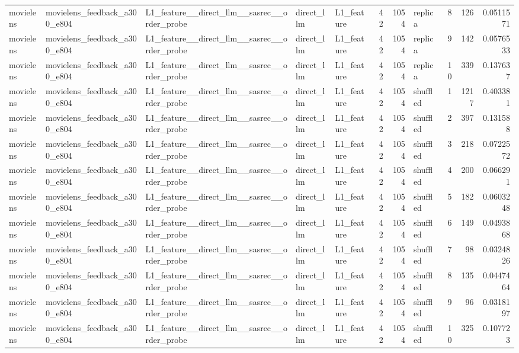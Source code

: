 \begin{table}[htbp!]
\begin{tabular}{lllllrrlrrr}
movielens & movielens\_feedback\_a300\_e804 & L1\_feature\_\_direct\_llm\_\_sasrec\_\_order\_probe & direct\_llm & L1\_feature & 42 & 1054 & replica & 8 & 126 & 0.0511571 \\
movielens & movielens\_feedback\_a300\_e804 & L1\_feature\_\_direct\_llm\_\_sasrec\_\_order\_probe & direct\_llm & L1\_feature & 42 & 1054 & replica & 9 & 142 & 0.0576533 \\
movielens & movielens\_feedback\_a300\_e804 & L1\_feature\_\_direct\_llm\_\_sasrec\_\_order\_probe & direct\_llm & L1\_feature & 42 & 1054 & replica & 10 & 339 & 0.137637 \\
movielens & movielens\_feedback\_a300\_e804 & L1\_feature\_\_direct\_llm\_\_sasrec\_\_order\_probe & direct\_llm & L1\_feature & 42 & 1054 & shuffled & 1 & 1217 & 0.403381 \\
movielens & movielens\_feedback\_a300\_e804 & L1\_feature\_\_direct\_llm\_\_sasrec\_\_order\_probe & direct\_llm & L1\_feature & 42 & 1054 & shuffled & 2 & 397 & 0.131588 \\
movielens & movielens\_feedback\_a300\_e804 & L1\_feature\_\_direct\_llm\_\_sasrec\_\_order\_probe & direct\_llm & L1\_feature & 42 & 1054 & shuffled & 3 & 218 & 0.0722572 \\
movielens & movielens\_feedback\_a300\_e804 & L1\_feature\_\_direct\_llm\_\_sasrec\_\_order\_probe & direct\_llm & L1\_feature & 42 & 1054 & shuffled & 4 & 200 & 0.066291 \\
movielens & movielens\_feedback\_a300\_e804 & L1\_feature\_\_direct\_llm\_\_sasrec\_\_order\_probe & direct\_llm & L1\_feature & 42 & 1054 & shuffled & 5 & 182 & 0.0603248 \\
movielens & movielens\_feedback\_a300\_e804 & L1\_feature\_\_direct\_llm\_\_sasrec\_\_order\_probe & direct\_llm & L1\_feature & 42 & 1054 & shuffled & 6 & 149 & 0.0493868 \\
movielens & movielens\_feedback\_a300\_e804 & L1\_feature\_\_direct\_llm\_\_sasrec\_\_order\_probe & direct\_llm & L1\_feature & 42 & 1054 & shuffled & 7 & 98 & 0.0324826 \\
movielens & movielens\_feedback\_a300\_e804 & L1\_feature\_\_direct\_llm\_\_sasrec\_\_order\_probe & direct\_llm & L1\_feature & 42 & 1054 & shuffled & 8 & 135 & 0.0447464 \\
movielens & movielens\_feedback\_a300\_e804 & L1\_feature\_\_direct\_llm\_\_sasrec\_\_order\_probe & direct\_llm & L1\_feature & 42 & 1054 & shuffled & 9 & 96 & 0.0318197 \\
movielens & movielens\_feedback\_a300\_e804 & L1\_feature\_\_direct\_llm\_\_sasrec\_\_order\_probe & direct\_llm & L1\_feature & 42 & 1054 & shuffled & 10 & 325 & 0.107723 \\

\end{tabular}
\end{table}
